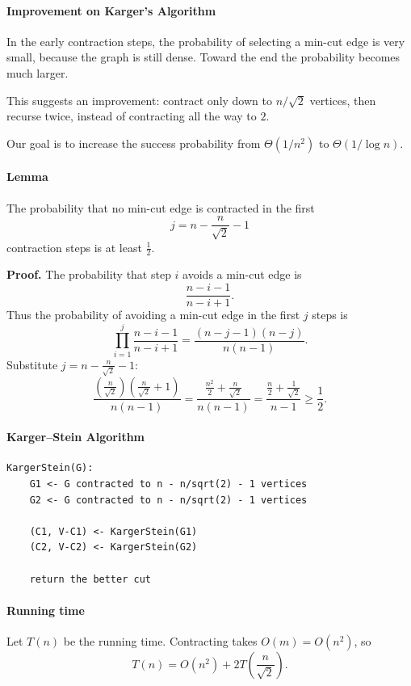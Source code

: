 \documentclass{article}
\begin{document}
\paragraph{Improvement on Karger's Algorithm}
In the early contraction steps, the probability of selecting a min-cut edge is very small, because the graph is still dense. Toward the end the probability becomes much larger.

This suggests an improvement: contract only down to $n/\sqrt{2}$ vertices, then recurse twice, instead of contracting all the way to $2$.

Our goal is to increase the success probability from $\Theta(1/n^{2})$ to $\Theta(1/\log n)$.

\paragraph{Lemma}
The probability that no min-cut edge is contracted in the first
\[
j = n - \frac{n}{\sqrt{2}} - 1
\]
contraction steps is at least $\frac{1}{2}$.

\textbf{Proof.}
The probability that step $i$ avoids a min-cut edge is
\[
\frac{n-i-1}{n-i+1}.
\]
Thus the probability of avoiding a min-cut edge in the first $j$ steps is
\[
\prod_{i=1}^{j} \frac{n-i-1}{n-i+1}
= \frac{(n-j-1)(n-j)}{n(n-1)}.
\]
Substitute $j = n - \frac{n}{\sqrt{2}} - 1$:
\[
\frac{\left(\frac{n}{\sqrt{2}}\right)\left(\frac{n}{\sqrt{2}} + 1\right)}{n(n-1)}
= \frac{\frac{n^{2}}{2} + \frac{n}{\sqrt{2}}}{n(n-1)}
= \frac{\tfrac{n}{2}+ \tfrac{1}{\sqrt{2}}}{n-1}
\ge \frac{1}{2}.
\]

\paragraph{Karger--Stein Algorithm}
\begin{verbatim}
KargerStein(G):
    G1 <- G contracted to n - n/sqrt(2) - 1 vertices
    G2 <- G contracted to n - n/sqrt(2) - 1 vertices

    (C1, V-C1) <- KargerStein(G1)
    (C2, V-C2) <- KargerStein(G2)

    return the better cut
\end{verbatim}

\paragraph{Running time}
Let $T(n)$ be the running time. Contracting takes $O(m)=O(n^{2})$, so
\[
T(n) = O(n^{2}) + 2T\left(\frac{n}{\sqrt{2}}\right).
\]
\end{document}
